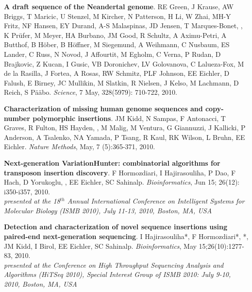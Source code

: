 \vspace{-.2cm}
    {\bf A draft sequence of the Neandertal genome}. RE Green, J Krause, 
    AW Briggs, T Maricic, U Stenzel, M Kircher, N Patterson, 
    H Li, W Zhai, MH-Y Fritz, NF Hansen, EY Durand, 
    A-S Malaspinas, JD Jensen, T Marques-Bonet, \calkan{}, K Pr\"{u}fer, M Meyer, HA Burbano, JM Good, R Schultz, A Aximu-Petri, 
    A Butthof, B H\"{o}ber, B H\"{o}ffner, M Siegemund, A Weihmann, C
    Nusbaum, ES Lander, C Russ, N Novod, J Affourtit, M Egholm, 
    C Verna, P Rudan, D Brajkovic, Z Kucan, I Gusic, VB 
    Doronichev, LV Golovanova, C Lalueza-Fox, M de la Rasilla, J Fortea, 
    A Rosas, RW Schmitz, PLF Johnson, EE Eichler, D Falush, E 
    Birney, JC Mullikin, M Slatkin, R Nielsen, J Kelso, M Lachmann, 
    D Reich, S P\"{a}\"{a}bo. {\em Science}, 7 May, 328(5979): 710-722, 2010. \\
    
\vspace{-.2cm}
    {\bf Characterization of missing human genome sequences and
    copy-number polymorphic insertions}.
    JM Kidd, N Sampas, F Antonacci, T Graves, R Fulton, HS Hayden, \calkan{}, M Malig, M Ventura, G Giannuzzi, J Kallicki, P Anderson, A Tsalenko, 
    NA Yamada, P Tsang, R Kaul, RK Wilson, L Bruhn, EE Eichler.
    {\em Nature Methods}, May, 7 (5):365-371, 2010.
    

\vspace{-.2cm}
    {\bf Next-generation VariationHunter: combinatorial algorithms for transposon insertion discovery}.
    F Hormozdiari, I Hajirasouliha, P Dao, F Hach, D Yorukoglu, \calkan{},
    EE Eichler, SC Sahinalp.
    {\em Bioinformatics}, Jun 15; 26(12): i350-i357, 2010. \\
    \hspace*{1cm} {\footnotesize {\em presented at the 18$^{th}$ Annual International Conference on Intelligent Systems
    for Molecular Biology (ISMB 2010), July 11-13, 2010, Boston, MA, USA}}
    
\vspace{-.2cm}
    {\bf Detection and characterization of novel sequence insertions using paired-end next-generation sequencing}.
    I Hajirasouliha*, F Hormozdiari*, \calkan{}*, JM Kidd, I Birol, EE Eichler, SC Sahinalp.
    {\em Bioinformatics}, May 15;26(10):1277-83, 2010. \\
    \hspace*{1cm} {\footnotesize {\em presented at the Conference on High Throughput Sequencing Analysis and Algorithms (HiTSeq 2010), 
    Special Interest Group of ISMB 2010: July 9-10, 2010, Boston, MA, USA}}
    

